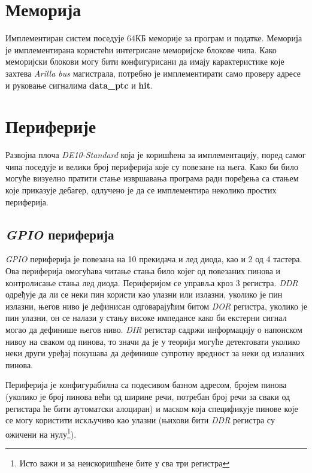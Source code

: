 \section{Меморија}

Имплементиран систем поседује 64КБ меморије за програм и податке. Меморија је имплементирана користећи интегрисане меморијске блокове  чипа. Како меморијски блокови могу бити конфигурисани да имају карактеристике које захтева \textit{Arilla bus} магистрала, потребно је имплементирати само проверу адресе и руковање сигналима \textbf{data\_ptc} и \textbf{hit}.

\section{Периферије}

Развојна плоча \textit{DE10-Standard} \cite{de10} која је коришћена за имплементацију, поред самог  чипа поседује и велики број периферија које су повезане на њега. Како би било могуће визуелно пратити стање извршавања програма ради поређења са стањем које приказује дебагер, одлучено је да се имплементира неколико простих периферија.

\subsection{\textit{\acrshort{GPIO}} периферија}

\textit{\acrfull{GPIO}} периферија је повезана на 10 прекидача и лед диода, као и 2 од 4 тастера. Ова периферија омогућава читање стања било којег од повезаних пинова и контролисање стања лед диода. Периферијом се управља кроз 3 регистра. \textit{\acrfull{DDR}} одређује да ли се неки пин користи као улазни или излазни, уколико је пин излазни, његов ниво је дефинисан одговарајућим битом \textit{\acrfull{DOR}} регистра, уколико је пин улазни, он се налази у стању високе импедансе како би екстерни сигнал могао да дефинише његов ниво. \textit{\acrfull{DIR}} регистар садржи информацију о напонском нивоу на сваком од пинова, то значи да је у теорији могуће детектовати уколико неки други уређај покушава да дефинише супротну вредност за неки од излазних пинова.



Периферија је конфигурабилна са подесивом базном адресом, бројем пинова (уколико је број пинова већи од ширине речи, потребан број речи за сваки од регистара ће бити аутоматски алоциран) и маском која спецификује пинове које се могу користити искључиво као улазни (њихови бити \textit{\acrshort{DDR}} регистра су ожичени на нулу\footnote{Исто важи и за неискоришћене бите у сва три регистра}).

